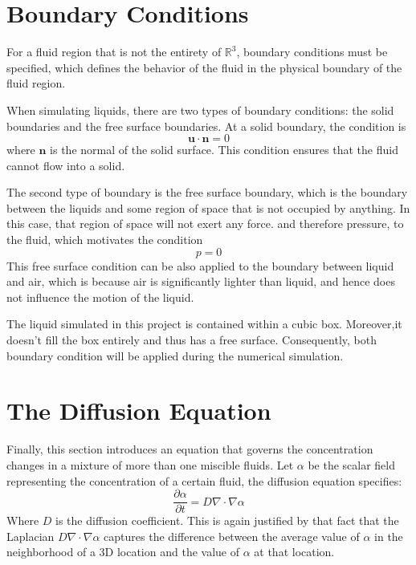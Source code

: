 \section{Boundary Conditions}

For a fluid region that is not the entirety of $\mathbb{R}^3$, boundary conditions must be specified, which defines the behavior of the fluid in the physical boundary of the fluid region.

When simulating liquids, there are two types of boundary conditions: the solid boundaries and the free surface boundaries. At a solid boundary, the condition is 
$$
    \textbf{u} \cdot \textbf{n} = 0
$$
where $\textbf{n}$ is the normal of the solid surface. This condition ensures that the fluid cannot flow into a solid. 

The second type of boundary is the free surface boundary, which is the boundary between the liquids and some region of space that is not occupied by anything. In this case, that region of space will not exert any force. and therefore pressure, to the fluid, which motivates the condition
$$
p = 0
$$
This free surface condition can be also applied to the boundary between liquid and air, which is because air is significantly lighter than liquid, and hence does not influence the motion of the liquid.

The liquid simulated in this project is contained within a cubic box. Moreover,it doesn't fill the box entirely and thus has a free surface. Consequently, both boundary condition will be applied during the numerical simulation. 

\section{The Diffusion Equation}
Finally, this section introduces an equation that governs the concentration changes in a mixture of more than one miscible fluids.
Let $\alpha$ be the scalar field representing the concentration of a certain fluid, the diffusion equation specifies:
\begin{equation}
    \tag{Diffusion Equation}
    \frac{\partial \alpha}{\partial t} = D\nabla \cdot \nabla \alpha
\end{equation}
Where $D$ is the diffusion coefficient. This is again justified by that fact that the Laplacian $D\nabla \cdot \nabla \alpha$ captures the difference between the average value of $\alpha$ in the neighborhood of a 3D location and the value of $\alpha$ at that location.